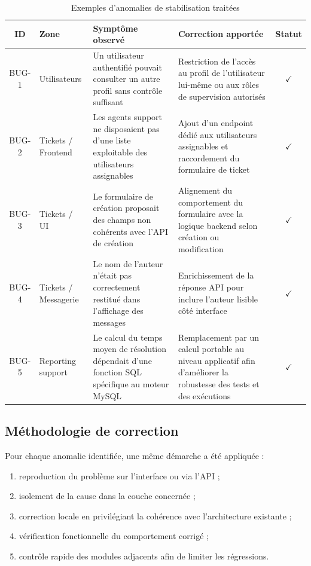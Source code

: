 \begin{table}[H]
\centering
\footnotesize
\caption{Exemples d'anomalies de stabilisation traitées}
\label{tab:bugs}
\begin{tabularx}{\textwidth}{|c|l|X|X|c|}
\hline
\textbf{ID} & \textbf{Zone} & \textbf{Symptôme observé} & \textbf{Correction apportée} & \textbf{Statut} \\
\hline
BUG-1 & Utilisateurs & Un utilisateur authentifié pouvait consulter un autre profil sans contrôle suffisant & Restriction de l'accès au profil de l'utilisateur lui-même ou aux rôles de supervision autorisés & $\checkmark$ \\
\hline
BUG-2 & Tickets / Frontend & Les agents support ne disposaient pas d'une liste exploitable des utilisateurs assignables & Ajout d'un endpoint dédié aux utilisateurs assignables et raccordement du formulaire de ticket & $\checkmark$ \\
\hline
BUG-3 & Tickets / UI & Le formulaire de création proposait des champs non cohérents avec l'API de création & Alignement du comportement du formulaire avec la logique backend selon création ou modification & $\checkmark$ \\
\hline
BUG-4 & Tickets / Messagerie & Le nom de l'auteur n'était pas correctement restitué dans l'affichage des messages & Enrichissement de la réponse API pour inclure l'auteur lisible côté interface & $\checkmark$ \\
\hline
BUG-5 & Reporting support & Le calcul du temps moyen de résolution dépendait d'une fonction SQL spécifique au moteur MySQL & Remplacement par un calcul portable au niveau applicatif afin d'améliorer la robustesse des tests et des exécutions & $\checkmark$ \\
\hline
\end{tabularx}
\end{table}

\subsection{Méthodologie de correction}
Pour chaque anomalie identifiée, une même démarche a été appliquée :
\begin{enumerate}
    \item reproduction du problème sur l'interface ou via l'API ;
    \item isolement de la cause dans la couche concernée ;
    \item correction locale en privilégiant la cohérence avec l'architecture existante ;
    \item vérification fonctionnelle du comportement corrigé ;
    \item contrôle rapide des modules adjacents afin de limiter les régressions.
\end{enumerate}

